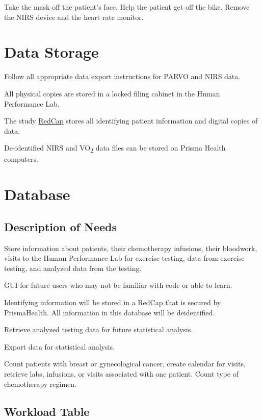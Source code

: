 \documentclass[
]{book}
\begin{document}
Take the mask off the patient's face. Help the patient get off the bike. Remove the NIRS device and the heart rate monitor.

\hypertarget{DataStorage}{%
\chapter{Data Storage}\label{DataStorage}}

Follow all appropriate data export instructions for PARVO and NIRS data.

All physical copies are stored in a locked filing cabinet in the Human Performance Lab.

The study \href{https://redcap.prismahealth.org}{RedCap} stores all identifying patient information and digital copies of data.

De-identified NIRS and VO\textsubscript{2} data files can be stored on Prisma Health computers.

\hypertarget{database}{%
\chapter{Database}\label{database}}

\hypertarget{description-of-needs}{%
\section{Description of Needs}\label{description-of-needs}}

Store information about patients, their chemotherapy infusions, their bloodwork, visits to the Human Performance Lab for exercise testing, data from exercise testing, and analyzed data from the testing.

GUI for future users who may not be familiar with code or able to learn.

Identifying information will be stored in a RedCap that is secured by PrismaHealth. All information in this database will be deidentified.

Retrieve analyzed testing data for future statistical analysis.

Export data for statistical analysis.

Count patients with breast or gynecological cancer, create calendar for visits, retrieve labs, infusions, or visits associated with one patient.
Count type of chemotherapy regimen.

\hypertarget{workload-table}{%
\section{Workload Table}\label{workload-table}}
\end{document}
